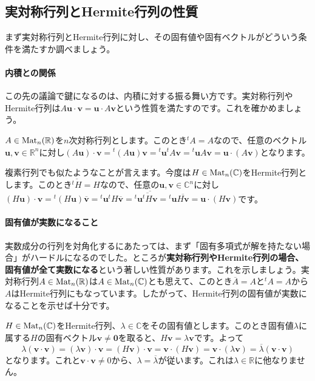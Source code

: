 \subsection{実対称行列とHermite行列の性質}

まず実対称行列とHermite行列に対し、その固有値や固有ベクトルがどういう条件を満たすか調べましょう。

\paragraph{内積との関係}

この先の議論で鍵になるのは、内積に対する振る舞い方です。実対称行列やHermite行列は$A\bm{u} \cdot \bm{v} = \bm{u} \cdot A\bm{v}$という性質を満たすのです。これを確かめましょう。

$A \in \operatorname{Mat}_n(\mathbb{R})$を$n$次対称行列とします。このとき${}^t\!A = A$なので、任意のベクトル$\bm{u}, \bm{v} \in \mathbb{R}^n$に対し$(A\bm{u}) \cdot \bm{v} = {}^t(A\bm{u}) \bm{v} = {}^t\bm{u} {}^t\!A \bm{v} = {}^t\bm{u} A\bm{v} = \bm{u} \cdot (A\bm{v})$となります。

複素行列でも似たようなことが言えます。今度は$H \in \operatorname{Mat}_n(\mathbb{C})$をHermite行列とします。このとき$\overline{{}^tH} = H$なので、任意の$\bm{u}, \bm{v} \in \mathbb{C}^n$に対し$(H\bm{u})\cdot \bm{v} = {}^t(H\bm{u}) \overline{\bm{v}} = {}^t\bm{u} {}^t\!H\overline{\bm{v}} = {}^t\bm{u} \overline{\overline{{}^t\!H}\bm{v}} = {}^t\bm{u} \overline{H\bm{v}} = \bm{u} \cdot (H\bm{v})$です。

\paragraph{固有値が実数になること}

実数成分の行列を対角化するにあたっては、まず「固有多項式が解を持たない場合」がハードルになるのでした。ところが\textbf{実対称行列やHermite行列の場合、固有値が全て実数になる}という著しい性質があります。これを示しましょう。実対称行列$A \in \operatorname{Mat}_n(\mathbb{R})$は$A \in \operatorname{Mat}_n(\mathbb{C})$とも思えて、このとき$\overline{A} = A$と${}^t\!A = A$から$A$はHermite行列にもなっています。したがって、Hermite行列の固有値が実数になることを示せば十分です。

$H \in \operatorname{Mat}_n(\mathbb{C})$をHermite行列、$\lambda \in \mathbb{C}$をその固有値とします。このとき固有値$\lambda$に属する$H$の固有ベクトル$\bm{v} \neq \bm{0}$を取ると、$H\bm{v} = \lambda \bm{v}$です。よって
\[
\lambda(\bm{v} \cdot \bm{v}) = (\lambda\bm{v}) \cdot \bm{v} = (H\bm{v}) \cdot \bm{v} = \bm{v} \cdot (H\bm{v})
= \bm{v} \cdot (\lambda\bm{v}) = \overline{\lambda} (\bm{v} \cdot \bm{v})
\]
となります。これと$\bm{v} \cdot \bm{v} \neq 0$から、$\lambda = \overline{\lambda}$が従います。これは$\lambda \in \mathbb{R}$に他なりません。

